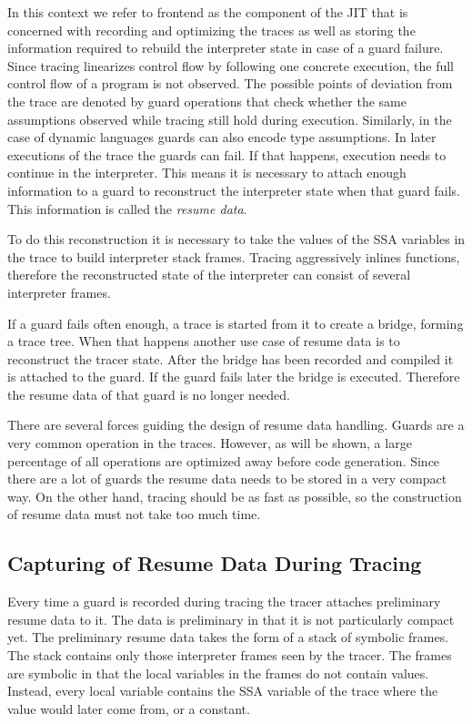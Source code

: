 \documentclass[letter,10pt]{sigplanconf}
\begin{document}
In this context we refer to frontend as the component of the JIT that is
concerned with recording and optimizing the traces as well as storing the
information required to rebuild the interpreter state in case of a guard
failure.
Since tracing linearizes control flow by following one concrete execution,
the full control flow of a program is not observed.
The possible points of deviation from the trace are denoted by guard operations
that check whether the same assumptions observed while tracing
still hold during execution.
Similarly, in the case of dynamic languages guards can also encode type
assumptions.
In later executions of the trace the guards can fail.
If that happens, execution needs to continue in the interpreter.
This means it is necessary to attach enough information to a guard
to reconstruct the interpreter state when that guard fails.
This information is called the \emph{resume data}.

To do this reconstruction it is necessary to take the values of the SSA
variables in the trace to build interpreter stack frames.  Tracing
aggressively inlines functions, therefore the reconstructed state of the
interpreter can consist of several interpreter frames.

If a guard fails often enough, a trace is started from it
to create a bridge, forming a trace tree.
When that happens another use case of resume data
is to reconstruct the tracer state.
After the bridge has been recorded and compiled it is attached to the guard.
If the guard fails later the bridge is executed. Therefore the resume data of
that guard is no longer needed.

There are several forces guiding the design of resume data handling.
Guards are a very common operation in the traces.
However, as will be shown, a large percentage of all operations
are optimized away before code generation.
Since there are a lot of guards
the resume data needs to be stored in a very compact way.
On the other hand, tracing should be as fast as possible,
so the construction of resume data must not take too much time.

\subsection{Capturing of Resume Data During Tracing}
\label{sub:capturing}

Every time a guard is recorded during tracing
the tracer attaches preliminary resume data to it.
The data is preliminary in that it is not particularly compact yet.
The preliminary resume data takes the form of a stack of symbolic frames.
The stack contains only those interpreter frames seen by the tracer.
The frames are symbolic in that the local variables in the frames
do not contain values.
Instead, every local variable contains the SSA variable of the trace
where the value would later come from, or a constant.
\end{document}
